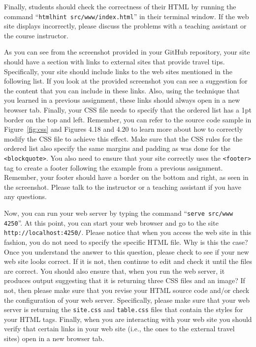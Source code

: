 \documentclass[11pt]{article}
\newcommand{\command}[1]{``\lstinline{#1}''}
\newcommand{\program}[1]{\lstinline{#1}}
\newcommand{\url}[1]{\lstinline{#1}}
\begin{document}
Finally, students should check the correctness of their
HTML by running the command \command{htmlhint src/www/index.html} in their
terminal window. If the web site displays incorrectly, please discuss the
problems with a teaching assistant or the course instructor.

As you can see from the screenshot provided in your GitHub repository, your
site should have a section with links to external sites that provide travel
tips. Specifically, your site should include links to the web sites mentioned
in the following list. If you look at the provided screenshot you can see a
suggestion for the content that you can include in these links. Also, using the
technique that you learned in a previous assignment, these links should always
open in a new browser tab. Finally, your CSS file needs to specify that the
ordered list has a 1pt border on the top and left. Remember, you can refer to
the source code sample in Figure~\ref{fig:css} and Figures 4.18 and 4.20 to
learn more about how to correctly modify the CSS file to achieve this effect.
Make sure that the CSS rules for the ordered list also specify the same margins
and padding as was done for the \program{<blockquote>}. You also need to ensure
that your site correctly uses the \program{<footer>} tag to create a footer
following the example from a previous assignment. Remember, your footer should
have a border on the bottom and right, as seen in the screenshot. Please talk
to the instructor or a teaching assistant if you have any questions.

Now, you can run your web server by typing the command \command{serve src/www
4250}. At this point, you can start your web browser and go to the site
\url{http://localhost:4250/}. Please notice that when you access the web site
in this fashion, you do not need to specify the specific HTML file. Why is this
the case? Once you understand the answer to this question, please check to see
if your new web site looks correct. If it is not, then continue to edit and
check it until the files are correct. You should also ensure that, when you run
the web server, it produces output suggesting that it is returning three CSS
files and an image? If not, then please make sure that you revise your HTML
source code and/or check the configuration of your web server. Specifically,
please make sure that your web server is returning the \program{site.css} and
\program{table.css} files that contain the styles for your HTML tags. Finally,
when you are interacting with your web site you should verify that certain
links  in your web site (i.e., the ones to the external travel sites) open in a
new browser tab.
\end{document}
